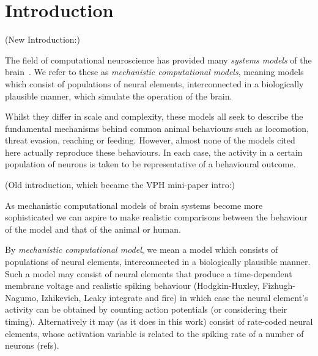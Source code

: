 \documentclass{frontiersSCNS}
\begin{document}
\section{Introduction}

(New Introduction:)

The field of computational neuroscience has provided
many \emph{systems models} of the brain~\cite{several_models}. We
refer to these as \emph{mechanistic computational models}, meaning
models which consist of populations of neural elements, interconnected
in a biologically plausible manner, which simulate the operation of
the brain.

Whilst they differ in scale and complexity, these models all seek to
describe the fundamental mechanisms behind common animal behaviours
such as locomotion, threat evasion, reaching or feeding. However,
almost none of the models cited here actually reproduce these
behaviours. In each case, the activity in a certain population of
neurons is taken to be representative of a behavioural outcome.


(Old introduction, which became the VPH mini-paper intro:)

As mechanistic computational models of brain systems become more
sophisticated we can aspire to make realistic comparisons between the
behaviour of the model and that of the animal or human.

By \emph{mechanistic computational model}, we mean a model which
consists of populations of neural elements, interconnected in a
biologically plausible manner. Such a model may consist of neural
elements that produce a time-dependent membrane voltage and realistic
spiking behaviour (Hodgkin-Huxley, Fizhugh-Nagumo, Izhikevich, Leaky
integrate and fire) in which case the neural element's activity can be
obtained by counting action potentials (or considering their
timing). Alternatively it may (as it does in this work) consist of
rate-coded neural elements, whose activation variable is related to
the spiking rate of a number of neurons (refs).
\end{document}
